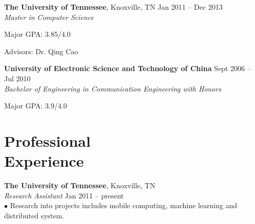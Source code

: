 \documentclass[margin, centered]{resume}
\begin{document}
\begin{resume}
    \textbf{The University of Tennessee}, Knoxville, TN \hfill Jan 2011 -- Dec 2013\vspace{0mm}\\\vspace{0mm}%
    \emph{Master in Computer Science} \vspace{-1mm}\\\vspace{-2mm}%
    \begin{list2}
        \item Major GPA: 3.85/4.0
        \item Advisors:  Dr. Qing Cao
    \end{list2}\vspace{-1mm}
    \textbf{University of Electronic Science and Technology of China} \hfill Sept 2006 -- Jul 2010\vspace{0mm}\\\vspace{0mm}%
	\emph{Bachelor of Engineering in Communication Engineering with Honors} \vspace{-1mm}\\\vspace{-2mm}%
	\begin{list2}
		\item Major GPA: 3.9/4.0
	\end{list2}\vspace{0mm} 

    \section{\mysidestyle Professional\\Experience}

    \textbf{The University of Tennessee}, Knoxville, TN \\\vspace{0mm}%
    \emph{Research Assistant} \hfill Jan 2011 -- present\vspace{0mm}\\
    $\bullet$ Research into projects includes mobile computing, machine learning and distributed system.\vspace{-6mm}\\


\end{resume}
\end{document}
